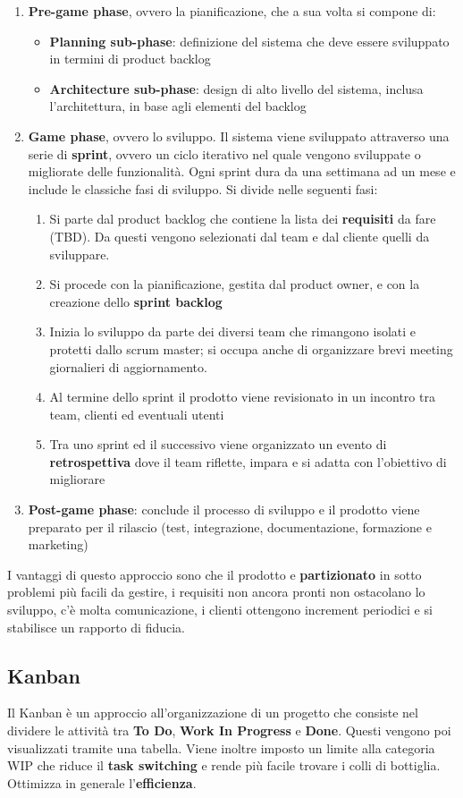\begin{enumerate}
	\item \textbf{Pre-game phase}, ovvero la pianificazione, che a sua volta si compone di:
	\begin{itemize}
		\item \textbf{Planning sub-phase}: definizione del sistema che deve essere sviluppato in termini di product backlog
		\item \textbf{Architecture sub-phase}: design di alto livello del sistema, inclusa l'architettura, in base agli elementi del backlog
	\end{itemize}
	\item \textbf{Game phase}, ovvero lo sviluppo. Il sistema viene sviluppato attraverso una serie di \textbf{sprint}, ovvero un ciclo iterativo nel quale vengono sviluppate o migliorate delle funzionalità. Ogni sprint dura da una settimana ad un mese e include le classiche fasi di sviluppo. Si divide nelle seguenti fasi:
	\begin{enumerate}
		\item Si parte dal product backlog che contiene la lista dei \textbf{requisiti} da fare (TBD). Da questi vengono selezionati dal team e dal cliente quelli da sviluppare.
		\item Si procede con la pianificazione, gestita dal product owner, e con la creazione dello \textbf{sprint backlog}
		\item Inizia lo sviluppo da parte dei diversi team che rimangono isolati e protetti dallo scrum master; si occupa anche di organizzare brevi meeting giornalieri di aggiornamento.
		\item Al termine dello sprint il prodotto viene revisionato in un incontro tra team, clienti ed eventuali utenti
		\item Tra uno sprint ed il successivo viene organizzato un evento di \textbf{retrospettiva} dove il team riflette, impara e si adatta con l'obiettivo di migliorare
	\end{enumerate}
	\item \textbf{Post-game phase}: conclude il processo di sviluppo e il prodotto viene preparato per il rilascio (test, integrazione, documentazione, formazione e marketing)
\end{enumerate}
I vantaggi di questo approccio sono che il prodotto e \textbf{partizionato} in sotto problemi più facili da gestire, i requisiti non ancora pronti non ostacolano lo sviluppo, c'è molta comunicazione, i clienti ottengono increment periodici e si stabilisce un rapporto di fiducia.

\subsection{Kanban}
Il Kanban è un approccio all'organizzazione di un progetto che consiste nel dividere le attività tra \textbf{To Do}, \textbf{Work In Progress} e \textbf{Done}. Questi vengono poi visualizzati tramite una tabella. Viene inoltre imposto un limite alla categoria WIP che riduce il \textbf{task switching} e rende più facile trovare i colli di bottiglia. Ottimizza in generale l'\textbf{efficienza}.
